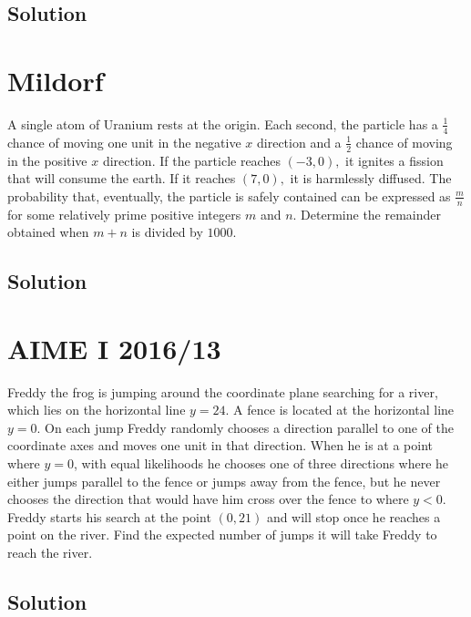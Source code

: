 \documentclass[mast]{lucky}
\begin{document}
\subsection{Solution}





\pagebreak\section{Mildorf} A single atom of Uranium rests at the origin. Each second, the particle has a $\frac{1}{4}$ chance of moving one unit in the negative $x$ direction and a $\frac{1}{2}$ chance of moving in the positive $x$ direction. If the particle reaches $(-3,0),$ it ignites a fission that will consume the earth. If it reaches $(7,0),$ it is harmlessly diffused. The probability that, eventually, the particle is safely contained can be expressed as $\frac{m}{n}$ for some relatively prime positive integers $m$ and $n.$ Determine the remainder obtained when $m+n$ is divided by $1000.$
\subsection{Solution}





\pagebreak\section{AIME I 2016/13} Freddy the frog is jumping around the coordinate plane searching for a river, which lies on the horizontal line $y = 24$. A fence is located at the horizontal line $y = 0$. On each jump Freddy randomly chooses a direction parallel to one of the coordinate axes and moves one unit in that direction. When he is at a point where $y=0$, with equal likelihoods he chooses one of three directions where he either jumps parallel to the fence or jumps away from the fence, but he never chooses the direction that would have him cross over the fence to where $y < 0$. Freddy starts his search at the point $(0, 21)$ and will stop once he reaches a point on the river. Find the expected number of jumps it will take Freddy to reach the river.
\subsection{Solution}
\end{document}
